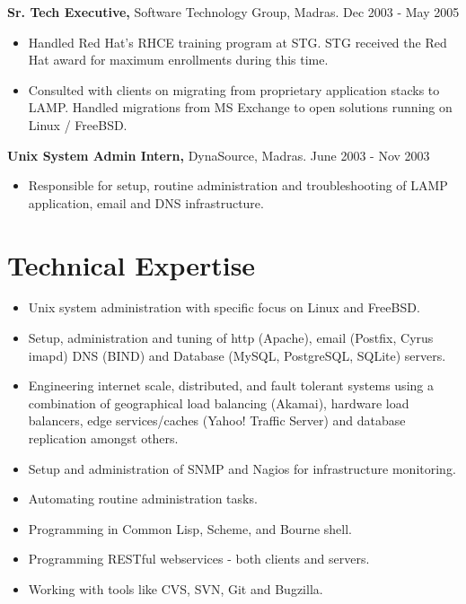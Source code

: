 \documentclass[margin]{res}
\begin{document}
\begin{resume}
\begin{itemize}
 \end{itemize}

{\bf Sr. Tech Executive,} Software Technology Group, Madras. \hfill Dec 2003 - May 2005
 \begin{itemize} \itemsep -2pt
 \item Handled Red Hat's RHCE training program at STG. STG received the Red Hat
   award for maximum enrollments during this time.
 \item Consulted with clients on migrating from proprietary application stacks
   to LAMP. Handled migrations from MS Exchange to open solutions running on 
   Linux / FreeBSD.
   
 \end{itemize}

{\bf Unix System Admin Intern,} DynaSource, Madras. \hfill June 2003 - Nov 2003
 \begin{itemize} \itemsep -2pt
 \item Responsible for setup, routine administration and troubleshooting 
   of LAMP \\ application, email and DNS infrastructure.
   
 \end{itemize}

\section{Technical Expertise} 
 \begin{itemize} \itemsep -2pt
 \item Unix system administration with specific focus on Linux and FreeBSD.
 \item Setup, administration and tuning of http (Apache), email (Postfix, Cyrus imapd)
   DNS (BIND) and Database (MySQL, PostgreSQL, SQLite) servers.
 \item Engineering internet scale, distributed, and fault tolerant systems 
   using a \\ combination of geographical load balancing (Akamai), hardware load 
   balancers, edge services/caches (Yahoo! Traffic Server) and database replication 
   amongst others.
 \item Setup and administration of SNMP and Nagios for infrastructure monitoring.
 \item Automating routine administration tasks.
 \item Programming in Common Lisp, Scheme, and Bourne shell.
 \item Programming RESTful webservices - both clients and servers.
 \item Working with tools like CVS, SVN, Git and Bugzilla.


\end{itemize}
\end{resume}
\end{document}
